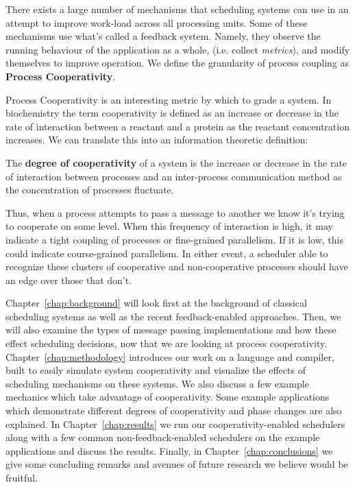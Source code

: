 There exists a large number of mechanisms that scheduling systems can use in an 
attempt to improve work-load across all processing units. Some of these 
mechanisms use what's called a feedback system. Namely, they observe the 
running behaviour of the application as a whole, (i.e. collect {\em metrics}),
and modify themselves to improve operation. We define the granularity of process
coupling as \textbf{Process Cooperativity}.

Process Cooperativity is an interesting metric by which to grade a system. In
biochemistry the term cooperativity is defined as an increase or decrease
in the rate of interaction between a reactant and a protein as the reactant
concentration increases. We can translate this into an information theoretic 
definition: 
\begin{newdef}\label{def:degree of cooperativity}
    The {\bf degree of cooperativity} of a system is the increase or decrease 
    in the rate of interaction between processes and an inter-process 
    communication method as the concentration of processes fluctuate.
\end{newdef}

Thus, when a process attempts to pass a message to another we know it's trying 
to cooperate on some level. When this frequency of interaction is high, it may
indicate a tight coupling of processes or fine-grained parallelism. If it is 
low, this could indicate course-grained parallelism. In either event, a 
scheduler able to recognize these clusters of cooperative and non-cooperative 
processes should have an edge over those that don't.

Chapter~\ref{chap:background} will look first at the background of classical 
scheduling systems as well as the recent feedback-enabled approaches. Then, we 
will also examine the types of message passing implementations and how these
effect scheduling decisions, now that we are looking at process cooperativity.
Chapter~\ref{chap:methodology} introduces our work on a language and compiler,
built to easily simulate system cooperativity and visualize the effects of 
scheduling mechanisms on these systems. We also discuss a few example mechanics
which take advantage of cooperativity. Some example applications which 
demonstrate different degrees of cooperativity and phase changes are also 
explained.
In Chapter~\ref{chap:results} we run our cooperativity-enabled schedulers along
with a few common non-feedback-enabled schedulers on the example applications
and discuss the results. 
Finally, in Chapter~\ref{chap:conclusions} we give some concluding remarks and
avenues of future research we believe would be fruitful.

